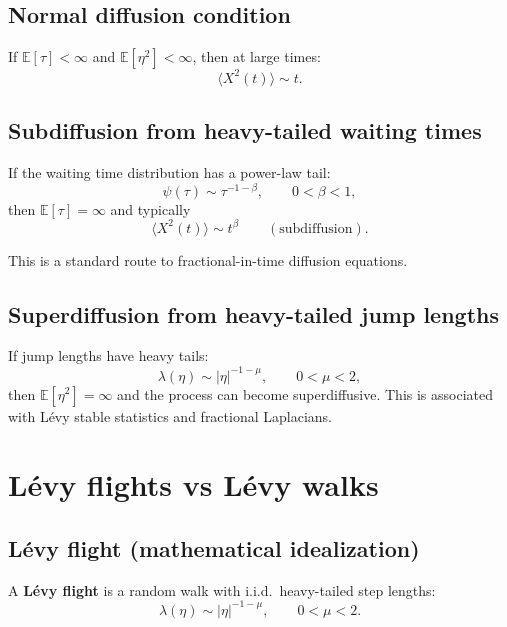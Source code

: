 \subsection{Normal diffusion condition}
If $\mathbb{E}[\tau]<\infty$ and $\mathbb{E}[\eta^2]<\infty$,
then at large times:
\[
\langle X^2(t)\rangle \sim t.
\]

\subsection{Subdiffusion from heavy-tailed waiting times}
If the waiting time distribution has a power-law tail:
\begin{equation}
\psi(\tau)\sim \tau^{-1-\beta},
\qquad 0<\beta<1,
\end{equation}
then $\mathbb{E}[\tau]=\infty$ and typically
\begin{equation}
\langle X^2(t)\rangle \sim t^\beta
\qquad (\text{subdiffusion}).
\end{equation}

This is a standard route to fractional-in-time diffusion equations.

\subsection{Superdiffusion from heavy-tailed jump lengths}
If jump lengths have heavy tails:
\begin{equation}
\lambda(\eta)\sim |\eta|^{-1-\mu},
\qquad 0<\mu<2,
\end{equation}
then $\mathbb{E}[\eta^2]=\infty$ and the process can become superdiffusive.
This is associated with Lévy stable statistics and fractional Laplacians.


\section{Lévy flights vs Lévy walks}

\subsection{Lévy flight (mathematical idealization)}
A \textbf{Lévy flight} is a random walk with i.i.d.\ heavy-tailed step lengths:
\begin{equation}
\lambda(\eta)\sim |\eta|^{-1-\mu},\qquad 0<\mu<2.
\end{equation}

